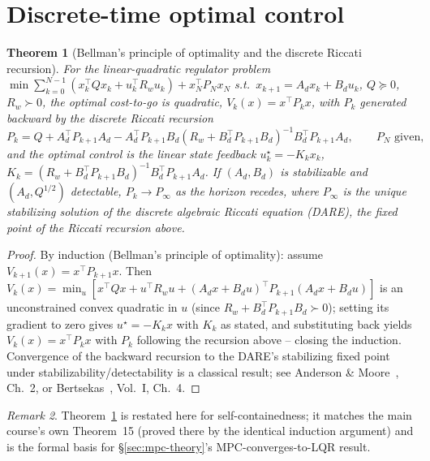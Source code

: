 \documentclass[11pt]{report}
\theoremstyle{plain}
\newtheorem{theorem}{Theorem}[chapter]
\theoremstyle{definition}
\theoremstyle{remark}
\newtheorem{remark}[theorem]{Remark}
\begin{document}
\section{Discrete-time optimal control}
\label{sec:control-prelim}

\begin{theorem}[Bellman's principle of optimality and the discrete Riccati recursion]
\label{thm:riccati}
For the linear-quadratic regulator problem
$\min\sum_{k=0}^{N-1}(x_k^\top Qx_k+u_k^\top R_wu_k)+x_N^\top
P_Nx_N$ s.t.\ $x_{k+1}=A_dx_k+B_du_k$, $Q\succeq0$, $R_w\succ0$, the
optimal cost-to-go is quadratic, $V_k(x)=x^\top P_kx$, with $P_k$
generated backward by the discrete Riccati recursion
\begin{equation}
P_k = Q + A_d^\top P_{k+1}A_d - A_d^\top P_{k+1}B_d(R_w+B_d^\top
P_{k+1}B_d)^{-1}B_d^\top P_{k+1}A_d, \qquad P_N \text{ given},
\label{eq:riccati-recursion}
\end{equation}
and the optimal control is the linear state feedback
$u_k^\star=-K_kx_k$, $K_k=(R_w+B_d^\top P_{k+1}B_d)^{-1}B_d^\top
P_{k+1}A_d$. If $(A_d,B_d)$ is stabilizable and $(A_d,Q^{1/2})$
detectable, $P_k\to P_\infty$ as the horizon recedes, where $P_\infty$
is the unique stabilizing solution of the discrete algebraic Riccati
equation (DARE), the fixed point of the Riccati recursion above.
\end{theorem}
\begin{proof}
By induction (Bellman's principle of optimality): assume $V_{k+1}(x)=x^\top
P_{k+1}x$. Then $V_k(x)=\min_u\left[x^\top Qx+u^\top R_wu+(A_dx+B_du)^\top
P_{k+1}(A_dx+B_du)\right]$ is an unconstrained convex quadratic in $u$
(since $R_w+B_d^\top P_{k+1}B_d\succ0$); setting its gradient to zero
gives $u^\star=-K_kx$ with $K_k$ as stated, and substituting back yields
$V_k(x)=x^\top P_kx$ with $P_k$ following the recursion above --
closing the induction. Convergence of the backward recursion to the
DARE's stabilizing fixed point under stabilizability/detectability is a
classical result; see Anderson \& Moore~\cite{andersonmoore}, Ch.~2, or
Bertsekas~\cite{bertsekasDP}, Vol.~I, Ch.~4.
\end{proof}

\begin{remark}
Theorem~\ref{thm:riccati} is restated here for self-containedness; it
matches the main course's own Theorem~15 (proved there by the identical
induction argument) and is the formal basis for
\S\ref{sec:mpc-theory}'s MPC-converges-to-LQR result.
\end{remark}
\end{document}
